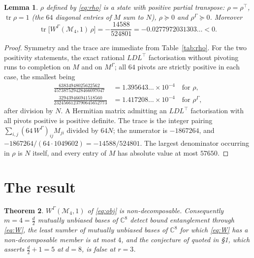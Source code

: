 \documentclass[11pt]{amsart}
\newtheorem{theorem}{Theorem}
\newtheorem{lemma}[theorem]{Lemma}
\DeclareMathOperator{\Tr}{tr}
\newcommand{\CC}{\mathbb C}
\newcommand{\W}{W^{\Gamma}}
\newcommand{\M}{\mathcal M}
\begin{document}
\begin{lemma}\label{lem:rho}
$\rho$ defined by \eqref{eq:rho} is a state with positive partial transpose:
$\rho=\rho^{\top}$, $\Tr\rho=1$ (the $64$ diagonal entries of $M$ sum to $N$),
$\rho\succeq0$ and $\rho^{\Gamma}\succeq0$. Moreover
\[
  \Tr\bigl[\W(\M_4,1)\,\rho\bigr]
  =-\frac{14588}{524801}
  =-0.0277972031303\ldots<0 .
\]
\end{lemma}

\begin{proof}
Symmetry and the trace are immediate from Table~\ref{tab:rho}. For the two positivity
statements, the exact rational $LDL^{\!\top}$ factorisation without pivoting runs to
completion on $M$ and on $M^{\Gamma}$; all $64$ pivots are strictly positive in each
case, the smallest being
\begin{align*}
  \frac{63834948025622562}{457387529428466097047}
   &=1.395643\ldots\times10^{-4}\quad\text{for }\rho,\\
  \frac{329439466941518560}{2324566123790645652773}
   &=1.417208\ldots\times10^{-4}\quad\text{for }\rho^{\Gamma},
\end{align*}
after division by $N$. A Hermitian matrix admitting an $LDL^{\!\top}$ factorisation
with all pivots positive is positive definite. The trace is the integer pairing
$\sum_{i,j}(64\,\W)_{ij}M_{ji}$ divided by $64N$; the numerator is $-1867264$, and
$-1867264/(64\cdot1049602)=-14588/524801$. The largest denominator occurring in $\rho$
is $N$ itself, and every entry of $M$ has absolute value at most $57650$.
\end{proof}

\section{The result}

\begin{theorem}\label{thm:main}
$\W(\M_4,1)$ of \eqref{eq:obj} is non-decomposable. Consequently $m=4=\frac d2$
mutually unbiased bases of $\CC^8$ detect bound entanglement through \eqref{eq:W}, the
least number of mutually unbiased bases of $\CC^8$ for which \eqref{eq:W} has a
non-decomposable member is at most $4$, and the conjecture of \cite{BBCHM} quoted
in \S1, which asserts $\frac d2+1=5$ at $d=8$, is false at $r=3$.
\end{theorem}
\end{document}

